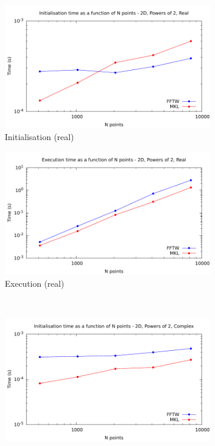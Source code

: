 \documentclass[12pt, a4paper]{article} \setlength{\textheight}{24cm}
\begin{document}
\begin{figure}[H]
  \captionsetup{width=0.8\linewidth}
  \centering
  \begin{subfigure}{.5\textwidth}
    \centering
    \includegraphics[width=.9\linewidth]{graphs/2d-pow2-init-r.pdf}
    \caption{Initialisation (real)}
    \label{2DPOW2RI}
  \end{subfigure}%
  \begin{subfigure}{.5\textwidth}
    \centering
    \includegraphics[width=.9\linewidth]{graphs/2d-pow2-exec-r.pdf}
    \caption{Execution (real)}
    \label{2DPOW2R}
  \end{subfigure}\\
  \begin{subfigure}{.5\textwidth}
    \centering
    \includegraphics[width=.9\linewidth]{graphs/2d-pow2-init-c.pdf}

\end{subfigure}
\end{figure}
\end{document}

